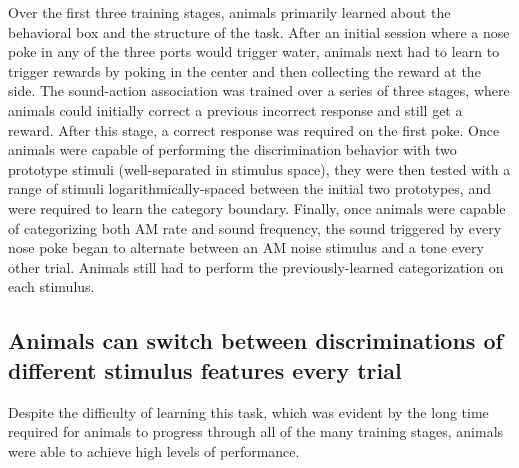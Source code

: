 \begin{table}
{%
Over the first three training stages, animals primarily learned about the behavioral box and the structure of the task.
%
After an initial session where a nose poke in any of the three ports would trigger water, animals next had to learn to trigger rewards by poking in the center and then collecting the reward at the side.
%
The sound-action association was trained over a series of three stages, where animals could initially correct a previous incorrect response and still get a reward.
%
After this stage, a correct response was required on the first poke.
%
Once animals were capable of performing the discrimination behavior with two prototype stimuli (well-separated in stimulus space), they were then tested with a range of stimuli logarithmically-spaced between the initial two prototypes, and were required to learn the category boundary.
%
Finally, once animals were capable of categorizing both AM rate and sound frequency, the sound triggered by every nose poke began to alternate between an AM noise stimulus and a tone every other trial.
%
Animals still had to perform the previously-learned categorization on each stimulus.}
\end{table}



\subsection{Animals can switch between discriminations of different stimulus
features every trial}

Despite the difficulty of learning this task, which was evident by the long
time required for animals to progress through all of the many training stages,
animals were able to achieve high levels of performance.

